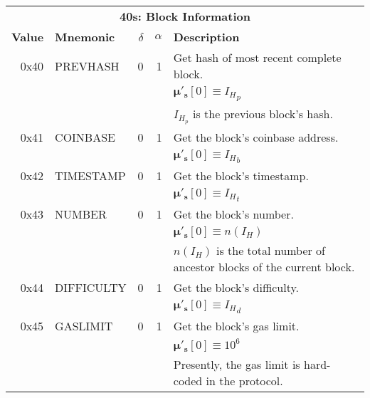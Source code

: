\documentclass[9pt,oneside]{amsart}
\begin{document}
\begin{tabular*}{\columnwidth}[h]{rlrrl}
\toprule
\multicolumn{5}{c}{\textbf{40s: Block Information}} \vspace{5pt} \\
\textbf{Value} & \textbf{Mnemonic} & $\delta$ & $\alpha$ & \textbf{Description} \vspace{5pt} \\
0x40 & {\small PREVHASH} & 0 & 1 & Get hash of most recent complete block. \\
&&&& $\boldsymbol{\mu}'_\mathbf{s}[0] \equiv {I_H}_p$ \\
&&&& $I_{H_p}$ is the previous block's hash. \\
\midrule
0x41 & {\small COINBASE} & 0 & 1 & Get the block's coinbase address. \\
&&&& $\boldsymbol{\mu}'_\mathbf{s}[0] \equiv {I_H}_b$ \\
\midrule
0x42 & {\small TIMESTAMP} & 0 & 1 & Get the block's timestamp. \\
&&&& $\boldsymbol{\mu}'_\mathbf{s}[0] \equiv {I_H}_t$ \\
\midrule
0x43 & {\small NUMBER} & 0 & 1 & Get the block's number. \\
&&&& $\boldsymbol{\mu}'_\mathbf{s}[0] \equiv n({I_H})$ \\
&&&& $n(I_H)$ is the total number of ancestor blocks of the current block. \\
\midrule
0x44 & {\small DIFFICULTY} & 0 & 1 & Get the block's difficulty. \\
&&&& $\boldsymbol{\mu}'_\mathbf{s}[0] \equiv {I_H}_d$ \\
\midrule
0x45 & {\small GASLIMIT} & 0 & 1 & Get the block's gas limit. \\
&&&& $\boldsymbol{\mu}'_\mathbf{s}[0] \equiv 10^6$ \\
&&&& Presently, the gas limit is hard-coded in the protocol. \\
\bottomrule
\end{tabular*}
\end{document}
